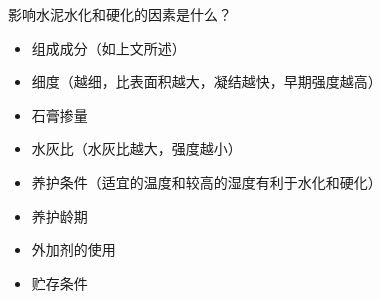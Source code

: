 \documentclass[12pt, a4paper, oneside, UTF8]{ctexbook}
\begin{document}
\begin{example}
	影响水泥水化和硬化的因素是什么？

	\begin{itemize}
		\item 组成成分（如上文所述）
		\item 细度（越细，比表面积越大，凝结越快，早期强度越高）
		\item 石膏掺量
		\item 水灰比（水灰比越大，强度越小）
		\item 养护条件（适宜的温度和较高的湿度有利于水化和硬化）
		\item 养护龄期
		\item 外加剂的使用
		\item 贮存条件
	\end{itemize}
	\end{example}

\ifx\allfiles\undefined
\end{document}
